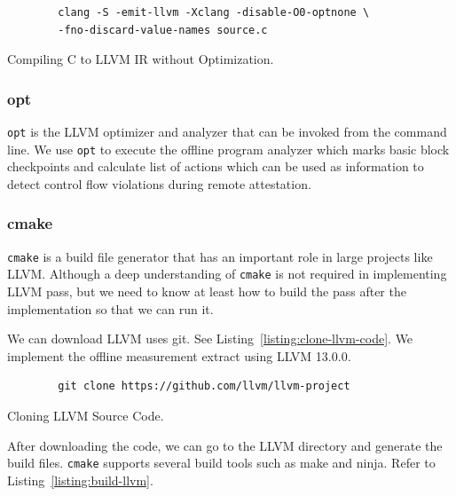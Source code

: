 \begin{listing}[htbp]
    \begin{verbatim}
        clang -S -emit-llvm -Xclang -disable-O0-optnone \
        -fno-discard-value-names source.c
    \end{verbatim}
    \caption{Compiling C to LLVM IR without Optimization.}    
    \label{listing:compile-llvm-to-ir-no-opt}
\end{listing}

\subsubsection{opt}

\texttt{opt} is the LLVM optimizer and analyzer that can be invoked from the
command line. We use \texttt{opt} to execute the offline program analyzer which
marks basic block checkpoints and calculate list of actions which can be used as
information to detect control flow violations during remote attestation.

\subsubsection{cmake}

\texttt{cmake} is a build file generator that has an important role in large
projects like LLVM. Although a deep understanding of \texttt{cmake} is not
required in implementing LLVM pass, but we need to know at least how to build
the pass after the implementation so that we can run it.

We can download LLVM uses git. See Listing~\ref{listing:clone-llvm-code}. We
implement the offline measurement extract using LLVM 13.0.0.

\begin{listing}[htbp]
    \begin{verbatim}
        git clone https://github.com/llvm/llvm-project
    \end{verbatim}
    \caption{Cloning LLVM Source Code.}    
    \label{listing:clone-llvm-code}
\end{listing}

After downloading the code, we can go to the LLVM directory and generate the
build files. \texttt{cmake} supports several build tools such as make and ninja.
Refer to Listing~\ref{listing:build-llvm}.

